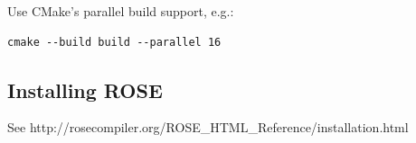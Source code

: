 Use CMake's parallel build support, e.g.:
\begin{verbatim}
cmake --build build --parallel 16
\end{verbatim}


\subsection{Installing ROSE}
\label{gettingStarted:installation}

See http://rosecompiler.org/ROSE\_HTML\_Reference/installation.html

